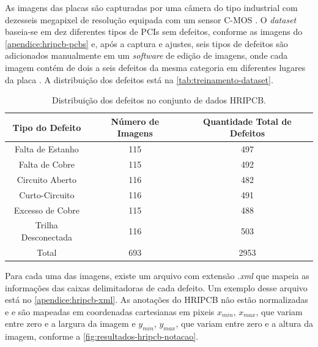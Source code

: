 As imagens das placas são capturadas por uma câmera do tipo industrial com dezesseis megapixel de resolução equipada com um sensor C-MOS \cite{ref:Huang-et-al}. O \textit{dataset} baseia-se em dez diferentes tipos de PCIs sem defeitos, conforme as imagens do \autoref{apendice:hripcb-pcbs} e, após a captura e ajustes, seis tipos de defeitos são adicionados manualmente em um \textit{software} de edição de imagens, onde cada imagem contém de dois a seis defeitos da mesma categoria em diferentes lugares da placa \cite{ref:Huang-et-al}. A distribuição dos defeitos está na \autoref{tab:treinamento-dataset}.

\begin{table}[!h]
\begin{center}
\caption{Distribuição dos defeitos no conjunto de dados HRIPCB.}
\label{tab:treinamento-dataset}
\begin{tabular}{ccc}
\toprule
\textbf{Tipo do Defeito} & \textbf{Número de Imagens} & \textbf{Quantidade Total de Defeitos} \\
\midrule \midrule
Falta de Estanho    & 115   & 497 \\
Falta de Cobre      & 115   & 492 \\
Circuito Aberto     & 116   & 482 \\
Curto-Circuito      & 116   & 491 \\
Excesso de Cobre    & 115   & 488 \\
Trilha Desconectada & 116   & 503 \\
Total               & 693   & 2953 \\
\bottomrule
\end{tabular}
\end{center}
\end{table}

Para cada uma das imagens, existe um arquivo com extensão \textit{.xml} que mapeia as informações das caixas delimitadoras de cada defeito. Um exemplo desse arquivo está no \autoref{apendice:hripcb-xml}.
As anotações do HRIPCB não estão normalizadas e e são mapeadas em coordenadas cartesianas em pixeis $x_{min}$, $x_{max}$, que variam entre zero e a largura da imagem e $y_{min}$, $y_{max}$, que variam entre zero e a altura da imagem, conforme a \autoref{fig:resultados-hripcb-notacao}.

